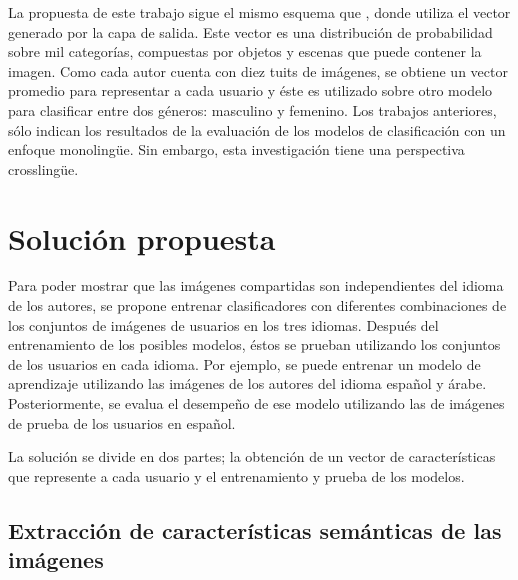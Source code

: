 \documentclass[runningheads]{llncs}
\begin{document}
La propuesta de este trabajo sigue el mismo esquema que \cite{aragon2018straightforward}, donde utiliza el vector generado por la capa de salida. Este vector es una
distribución de probabilidad sobre mil categorías, compuestas por 
objetos y escenas que puede contener la imagen. Como cada autor cuenta 
con diez tuits de imágenes, se obtiene un vector promedio para 
representar a cada usuario y éste es utilizado sobre otro modelo para 
clasificar entre dos géneros: masculino y femenino. 
Los trabajos anteriores, sólo indican los resultados de la evaluación de los modelos de clasificación con un enfoque monolingüe. Sin embargo, esta investigación tiene una perspectiva crosslingüe.




\section{Solución propuesta}

Para poder mostrar que las imágenes compartidas son independientes
del idioma de los autores, se propone entrenar clasificadores
con diferentes combinaciones de los conjuntos de imágenes de usuarios en los
tres idiomas. Después del entrenamiento de los posibles modelos, éstos se
prueban utilizando los conjuntos de los usuarios en cada idioma. Por ejemplo,
se puede entrenar un modelo de aprendizaje utilizando las imágenes de los
autores del idioma español y árabe. Posteriormente, se evalua el desempeño
de ese modelo utilizando las de imágenes de prueba de los usuarios
en español.

La solución se divide en dos partes; la obtención de un vector
de características que represente a cada usuario y el entrenamiento y 
prueba de los modelos. 

\subsection{Extracción de características semánticas de las imágenes}
\end{document}
